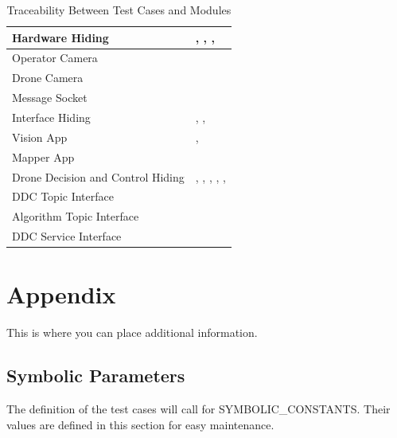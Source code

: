 \documentclass[12pt, titlepage]{article}
\begin{document}
\begin{table}[!h]
\begin{center}
\caption {Traceability Between Test Cases and Modules}
\label{tab:traceTC_Module}
\begin{tabular}{ | m{5cm} | m{10cm} | }
\hline
Hardware Hiding & \nameref{tab:UTC_001}, \nameref{tab:UTC_002}, \nameref{tab:UTC_003}, \nameref{tab:UTC_004} \\
\hline
Operator Camera & \nameref{tab:UTC_005}\\
\hline
Drone Camera &  \nameref{tab:UTC_006}\\
\hline
Message Socket &  \nameref{tab:UTC_007}\\
\hline
Interface Hiding &  \nameref{tab:UTC_008}, \nameref{tab:UTC_009}, \nameref{tab:UTC_010}\\
\hline
Vision App &  \nameref{tab:UTC_011}, \nameref{tab:UTC_012}\\
\hline
Mapper App &  \nameref{tab:UTC_013}\\
\hline
Drone Decision and Control Hiding &  \nameref{tab:UTC_014}, \nameref{tab:UTC_015}, \nameref{tab:UTC_016}, \nameref{tab:UTC_017}, \nameref{tab:UTC_018}, \nameref{tab:UTC_019} \\
\hline
DDC Topic Interface &  \nameref{tab:UTC_020}\\
\hline
Algorithm Topic Interface &  \nameref{tab:UTC_021}\\
\hline
DDC Service Interface &  \nameref{tab:UTC_022}\\
\hline

\end{tabular}
\end{center}
\end{table}		

\clearpage





\newpage

\section{Appendix}

This is where you can place additional information.

\subsection{Symbolic Parameters}

The definition of the test cases will call for SYMBOLIC\_CONSTANTS.
Their values are defined in this section for easy maintenance.
\end{document}
